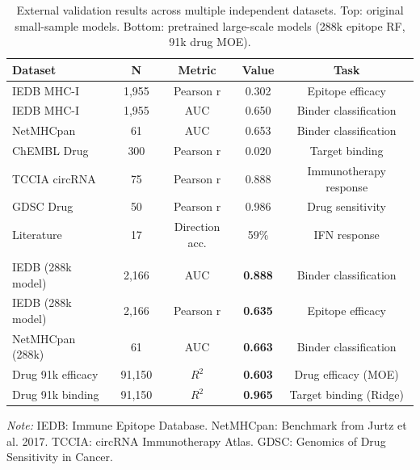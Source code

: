 \begin{table}[htbp]
\centering
\caption{External validation results across multiple independent datasets. Top: original small-sample models. Bottom: pretrained large-scale models (288k epitope RF, 91k drug MOE).}
\label{tab:validation}
\begin{tabular}{lcccc}
\toprule
Dataset & N & Metric & Value & Task \\
\midrule
IEDB MHC-I & 1,955 & Pearson r & 0.302 & Epitope efficacy \\
IEDB MHC-I & 1,955 & AUC & 0.650 & Binder classification \\
NetMHCpan & 61 & AUC & 0.653 & Binder classification \\
ChEMBL Drug & 300 & Pearson r & 0.020 & Target binding \\
TCCIA circRNA & 75 & Pearson r & 0.888 & Immunotherapy response \\
GDSC Drug & 50 & Pearson r & 0.986 & Drug sensitivity \\
Literature & 17 & Direction acc. & 59\% & IFN response \\
 &  &  &  &  \\
IEDB (288k model) & 2,166 & AUC & \textbf{0.888} & Binder classification \\
IEDB (288k model) & 2,166 & Pearson r & \textbf{0.635} & Epitope efficacy \\
NetMHCpan (288k) & 61 & AUC & \textbf{0.663} & Binder classification \\
Drug 91k efficacy & 91,150 & $R^2$ & \textbf{0.603} & Drug efficacy (MOE) \\
Drug 91k binding & 91,150 & $R^2$ & \textbf{0.965} & Target binding (Ridge) \\
\bottomrule
\end{tabular}
\footnotesize {\textit{Note:} IEDB: Immune Epitope Database. NetMHCpan: Benchmark from Jurtz et al. 2017. TCCIA: circRNA Immunotherapy Atlas. GDSC: Genomics of Drug Sensitivity in Cancer.}
\end{table}
